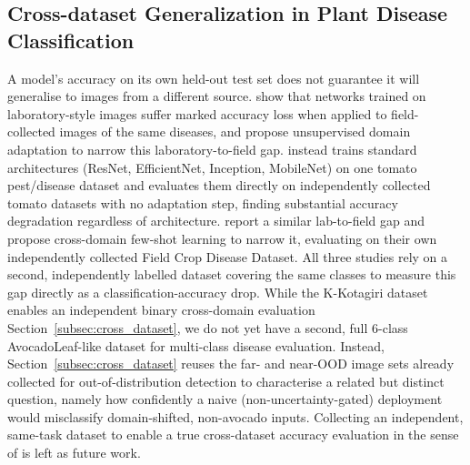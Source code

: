 \subsection{Cross-dataset Generalization in Plant Disease Classification}
A model's accuracy on its own held-out test set does not guarantee it will generalise to images from a different source. \citet{wu2023laboratory} show that networks trained on laboratory-style images suffer marked accuracy loss when applied to field-collected images of the same diseases, and propose unsupervised domain adaptation to narrow this laboratory-to-field gap. \citet{sun2024crossdataset} instead trains standard architectures (ResNet, EfficientNet, Inception, MobileNet) on one tomato pest/disease dataset and evaluates them directly on independently collected tomato datasets with no adaptation step, finding substantial accuracy degradation regardless of architecture. \citet{yang2024laboratory} report a similar lab-to-field gap and propose cross-domain few-shot learning to narrow it, evaluating on their own independently collected Field Crop Disease Dataset. All three studies rely on a second, independently labelled dataset covering the same classes to measure this gap directly as a classification-accuracy drop. While the K-Kotagiri dataset enables an independent binary cross-domain evaluation Section~\ref{subsec:cross_dataset}, we do not yet have a second, full 6-class AvocadoLeaf-like dataset for multi-class disease evaluation. Instead, Section~\ref{subsec:cross_dataset} reuses the far- and near-OOD image sets already collected for out-of-distribution detection to characterise a related but distinct question, namely how confidently a naive (non-uncertainty-gated) deployment would misclassify domain-shifted, non-avocado inputs. Collecting an independent, same-task dataset to enable a true cross-dataset accuracy evaluation in the sense of \citep{wu2023laboratory, sun2024crossdataset, yang2024laboratory} is left as future work.
